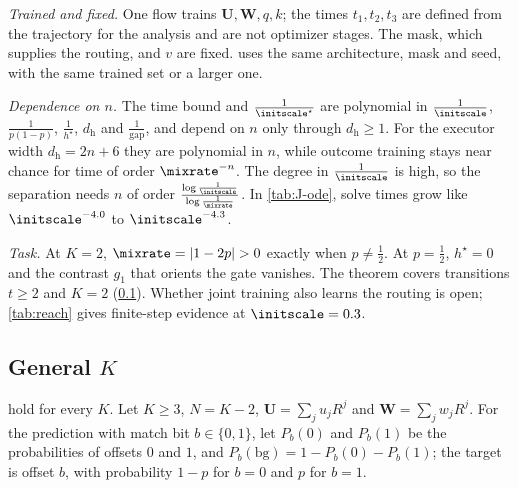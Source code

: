 \begin{remark}[Scope]
\label{rem:joint-scope}
\emph{Trained and fixed.} One flow trains $\mathbf U,\mathbf W,q,k$; the times $t_1,t_2,t_3$ are defined from the trajectory for the analysis and are not
optimizer stages. The mask, which supplies the routing, and $v$ are fixed.  uses the same architecture, mask and
seed, with the same trained set or a larger one.

\emph{Dependence on $n$.} The time bound and $\frac{1}{\initscale^\star}$ are polynomial in $\frac{1}{\initscale}$, $\frac{1}{p(1-p)}$, $\frac{1}{h^\star}$, $d_{\mathrm h}$ and $\frac{1}{\mathrm{gap}}$, and depend on
$n$ only through $d_{\mathrm h}\ge1$. For the executor width $d_{\mathrm h}=2n+6$ they are polynomial in $n$, while outcome training stays near chance for time of order $\mixrate^{-n}$. The degree in $\frac{1}{\initscale}$ is high, so the separation needs $n$ of order $\frac{\log\frac{1}{\initscale}}{\log\frac{1}{\mixrate}}$. In \cref{tab:J-ode},
solve times grow like $\initscale^{-4.0}$ to $\initscale^{-4.3}$.

\emph{Task.} At $K=2$, $\mixrate=|1-2p|>0$ exactly when $p\neq\frac{1}{2}$. At $p=\frac{1}{2}$, $ h^\star=0$ and the contrast $ g_1$ that orients the gate vanishes.
The theorem covers transitions $t\ge2$ and $K=2$ (\cref{app:J-generalK}). Whether joint training also learns the routing is open;
\cref{tab:reach} gives finite-step evidence at $\initscale=0.3$.
\end{remark}

\subsection{General \texorpdfstring{$K$}{K}}
\label{app:J-generalK}

 hold for every $K$. Let $K\ge3$, $N=K-2$, $\mathbf U=\sum_ju_jR^j$ and $\mathbf W=\sum_jw_jR^j$. For the prediction with match bit
$b\in\{0,1\}$, let $P_b(0)$ and $P_b(1)$ be the probabilities of offsets $0$ and $1$, and $P_b(\mathrm{bg})=1-P_b(0)-P_b(1)$; the target is offset $b$, with probability
$1-p$ for $b=0$ and $p$ for $b=1$.

